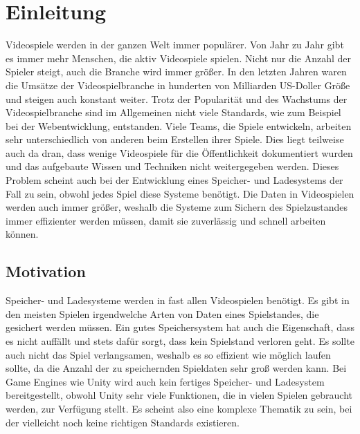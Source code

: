 \chapter{Einleitung}\label{ch:introduction}
Videospiele werden in der ganzen Welt immer populärer. Von Jahr zu Jahr gibt es immer mehr Menschen, die aktiv Videospiele spielen.\cite{explodingtopicsManyGamers} Nicht nur die Anzahl der Spieler steigt, auch die Branche wird immer größer. In den letzten Jahren waren die Umsätze der Videospielbranche in hunderten von Milliarden US-Doller Größe und steigen auch konstant weiter.\cite{statistaUmsatzVideogames} Trotz der Popularität und des Wachstums der Videospielbranche sind im Allgemeinen nicht viele Standards, wie zum Beispiel bei der Webentwicklung, entstanden. Viele Teams, die Spiele entwickeln, arbeiten sehr unterschiedlich von anderen beim Erstellen ihrer Spiele. Dies liegt teilweise auch da dran, dass wenige Videospiele für die Öffentlichkeit dokumentiert wurden und das aufgebaute Wissen und Techniken nicht weitergegeben werden. Dieses Problem scheint auch bei der Entwicklung eines Speicher- und Ladesystems der Fall zu sein, obwohl jedes Spiel diese Systeme benötigt. Die Daten in Videospielen werden auch immer größer, weshalb die Systeme zum Sichern des Spielzustandes immer effizienter werden müssen, damit sie zuverlässig und schnell arbeiten können.

\section{Motivation}
Speicher- und Ladesysteme werden in fast allen Videospielen benötigt. Es gibt in den meisten Spielen irgendwelche Arten von Daten eines Spielstandes, die gesichert werden müssen. Ein gutes Speichersystem hat auch die Eigenschaft, dass es nicht auffällt und stets dafür sorgt, dass kein Spielstand verloren geht. Es sollte auch nicht das Spiel verlangsamen, weshalb es so effizient wie möglich laufen sollte, da die Anzahl der zu speichernden Spieldaten sehr groß werden kann. Bei Game Engines wie Unity wird auch kein fertiges Speicher- und Ladesystem bereitgestellt, obwohl Unity sehr viele Funktionen, die in vielen Spielen gebraucht werden, zur Verfügung stellt. Es scheint also eine komplexe Thematik zu sein, bei der vielleicht noch keine richtigen Standards existieren. 


